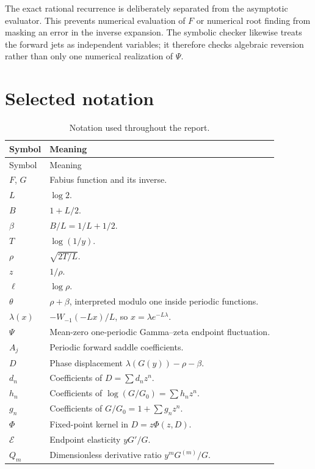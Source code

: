 \documentclass[11pt,oneside]{article}
\numberwithin{equation}{section}
\theoremstyle{definition}
\theoremstyle{remark}
\begin{document}
The exact rational recurrence is deliberately separated from the asymptotic evaluator.  This prevents numerical evaluation of $F$ or numerical root finding from masking an error in the inverse expansion.  The symbolic checker likewise treats the forward jets as independent variables; it therefore checks algebraic reversion rather than only one numerical realization of $\Psi$.

\section{Selected notation}
\label{app:notation}

\begin{longtable}{@{}p{}p{}@{}}
\caption{Notation used throughout the report.}\label{tab:notation}\\
\toprule
Symbol & Meaning \\
\midrule
\endfirsthead
\toprule
Symbol & Meaning \\
\midrule
\endhead
$F$, $G$ & Fabius function and its inverse. \\
$L$ & $\log2$. \\
$B$ & $1+L/2$. \\
$\beta$ & $B/L=1/L+1/2$. \\
$T$ & $\log(1/y)$. \\
$\rho$ & $\sqrt{2T/L}$. \\
$z$ & $1/\rho$. \\
$\ell$ & $\log\rho$. \\
$\theta$ & $\rho+\beta$, interpreted modulo one inside periodic functions. \\
$\lambda(x)$ & $-W_{-1}(-Lx)/L$, so $x=\lambda e^{-L\lambda}$. \\
$\Psi$ & Mean-zero one-periodic Gamma--zeta endpoint fluctuation. \\
$A_j$ & Periodic forward saddle coefficients. \\
$D$ & Phase displacement $\lambda(G(y))-\rho-\beta$. \\
$d_n$ & Coefficients of $D=\sum d_nz^n$. \\
$h_n$ & Coefficients of $\log(G/G_0)=\sum h_nz^n$. \\
$g_n$ & Coefficients of $G/G_0=1+\sum g_nz^n$. \\
$\Phi$ & Fixed-point kernel in $D=z\Phi(z,D)$. \\
$\mathcal E$ & Endpoint elasticity $yG'/G$. \\
$Q_m$ & Dimensionless derivative ratio $y^mG^{(m)}/G$. \\
\bottomrule
\end{longtable}
\end{document}
